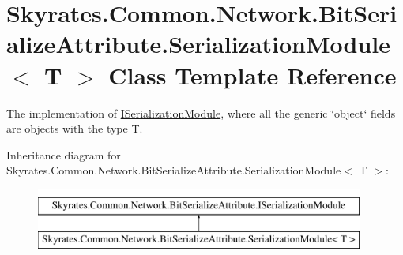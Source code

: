 \hypertarget{class_skyrates_1_1_common_1_1_network_1_1_bit_serialize_attribute_1_1_serialization_module_3_01_t_01_4}{\section{Skyrates.\-Common.\-Network.\-Bit\-Serialize\-Attribute.\-Serialization\-Module$<$ T $>$ Class Template Reference}
\label{class_skyrates_1_1_common_1_1_network_1_1_bit_serialize_attribute_1_1_serialization_module_3_01_t_01_4}
}


The implementation of \hyperlink{interface_skyrates_1_1_common_1_1_network_1_1_bit_serialize_attribute_1_1_i_serialization_module}{I\-Serialization\-Module}, where all the generic \char`\"{}object\char`\"{} fields are objects with the type T.  


Inheritance diagram for Skyrates.\-Common.\-Network.\-Bit\-Serialize\-Attribute.\-Serialization\-Module$<$ T $>$\-:\begin{figure}[H]
\begin{center}
\leavevmode
\includegraphics[height=2.000000cm]{class_skyrates_1_1_common_1_1_network_1_1_bit_serialize_attribute_1_1_serialization_module_3_01_t_01_4}
\end{center}
\end{figure}
